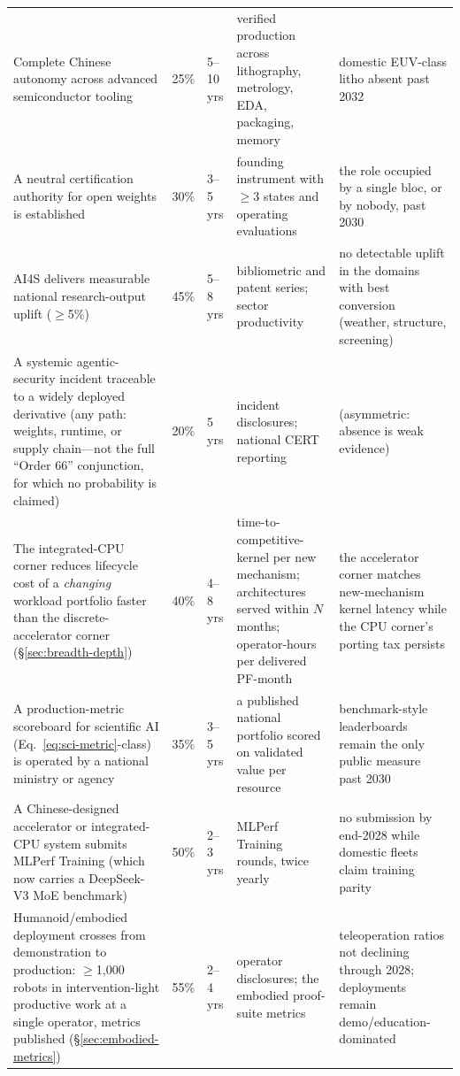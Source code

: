 \begin{small}
\begin{longtable}{p{42mm}p{16mm}p{13mm}p{31mm}p{31mm}}
    \addlinespace
    Complete Chinese autonomy across advanced semiconductor tooling & 25\% & 5--10 yrs & verified production across lithography, metrology, EDA, packaging, memory & domestic EUV-class litho absent past 2032 \\
    \addlinespace
    A neutral certification authority for open weights is established & 30\% & 3--5 yrs & founding instrument with $\geq$3 states and operating evaluations & the role occupied by a single bloc, or by nobody, past 2030 \\
    \addlinespace
    AI4S delivers measurable national research-output uplift ($\geq$5\%) & 45\% & 5--8 yrs & bibliometric and patent series; sector productivity & no detectable uplift in the domains with best conversion (weather, structure, screening) \\
    \addlinespace
    A systemic agentic-security incident traceable to a widely deployed derivative (any path: weights, runtime, or supply chain---not the full ``Order 66'' conjunction, for which no probability is claimed) & 20\% & 5 yrs & incident disclosures; national CERT reporting & (asymmetric: absence is weak evidence) \\
    \addlinespace
    The integrated-CPU corner reduces lifecycle cost of a \emph{changing} workload portfolio faster than the discrete-accelerator corner (\S\ref{sec:breadth-depth}) & 40\% & 4--8 yrs & time-to-competitive-kernel per new mechanism; architectures served within $N$ months; operator-hours per delivered PF-month & the accelerator corner matches new-mechanism kernel latency while the CPU corner's porting tax persists \\
    \addlinespace
    A production-metric scoreboard for scientific AI (Eq.~\ref{eq:sci-metric}-class) is operated by a national ministry or agency & 35\% & 3--5 yrs & a published national portfolio scored on validated value per resource & benchmark-style leaderboards remain the only public measure past 2030 \\
    \addlinespace
    A Chinese-designed accelerator or integrated-CPU system submits MLPerf Training (which now carries a DeepSeek-V3 MoE benchmark) & 50\% & 2--3 yrs & MLPerf Training rounds, twice yearly & no submission by end-2028 while domestic fleets claim training parity \\
    \addlinespace
    Humanoid/embodied deployment crosses from demonstration to production: $\ge$1,000 robots in intervention-light productive work at a single operator, metrics published (\S\ref{sec:embodied-metrics}) & 55\% & 2--4 yrs & operator disclosures; the embodied proof-suite metrics & teleoperation ratios not declining through 2028; deployments remain demo/education-dominated \\

\end{longtable}
\end{small}
